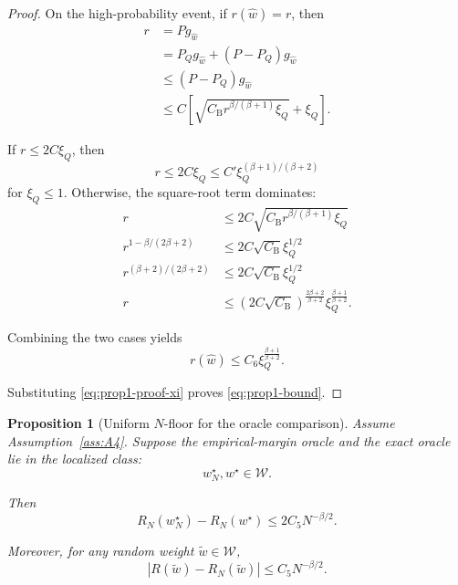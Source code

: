 \documentclass{article} %
\newtheorem{proposition}[theorem]{Proposition}
\providecommand{\Risk}{R}
\providecommand{\what}{\widehat{w}}
\providecommand{\wstar}{w^{\star}}
\begin{document}
\begin{proof}
On the high-probability event, if \(r(\what)=r\), then
\begin{align}
r
&=
Pg_{\what}
\label{eq:prop1-proof-a}
\\
&=
P_Qg_{\what}+(P-P_Q)g_{\what}
\label{eq:prop1-proof-b}
\\
&\le
(P-P_Q)g_{\what}
\label{eq:prop1-proof-c}
\\
&\le
C
\left[
\sqrt{C_{\mathrm B}r^{\beta/(\beta+1)}\xi_Q}
+
\xi_Q
\right].
\label{eq:prop1-proof-d}
\end{align}

If \(r\le 2C\xi_Q\), then
\begin{equation}
\label{eq:prop1-proof-small}
r
\le
2C\xi_Q
\le
C'\xi_Q^{(\beta+1)/(\beta+2)}
\end{equation}
for \(\xi_Q\le 1\).  Otherwise, the square-root term dominates:
\begin{align}
r
&\le
2C\sqrt{C_{\mathrm B}r^{\beta/(\beta+1)}\xi_Q}
\label{eq:prop1-proof-e}
\\
r^{1-\beta/(2\beta+2)}
&\le
2C\sqrt{C_{\mathrm B}}\xi_Q^{1/2}
\label{eq:prop1-proof-f}
\\
r^{(\beta+2)/(2\beta+2)}
&\le
2C\sqrt{C_{\mathrm B}}\xi_Q^{1/2}
\label{eq:prop1-proof-g2}
\\
r
&\le
(2C\sqrt{C_{\mathrm B}})^{\frac{2\beta+2}{\beta+2}}
\xi_Q^{\frac{\beta+1}{\beta+2}} .
\label{eq:prop1-proof-h}
\end{align}

Combining the two cases yields
\begin{equation}
\label{eq:prop1-proof-final}
r(\what)
\le
C_6 \xi_Q^{\frac{\beta+1}{\beta+2}} .
\end{equation}

Substituting \eqref{eq:prop1-proof-xi} proves \eqref{eq:prop1-bound}.
\end{proof}

\begin{proposition}[Uniform \(N\)-floor for the oracle comparison]
\label{prop:2}
Assume Assumption~\ref{ass:A4}.  Suppose the empirical-margin oracle and the
exact oracle lie in the localized class:
\begin{equation}
\label{eq:prop2-membership}
w_N^\star,\wstar\in\mathcal W .
\end{equation}

Then
\begin{equation}
\label{eq:prop2-bound}
\Risk_N(w_N^\star)-\Risk_N(\wstar)
\le
2C_5N^{-\beta/2}.
\end{equation}

Moreover, for any random weight \(\widetilde w\in\mathcal W\),
\begin{equation}
\label{eq:prop2-random}
|\Risk(\widetilde w)-\Risk_N(\widetilde w)|
\le
C_5N^{-\beta/2}.
\end{equation}
\end{proposition}
\end{document}
